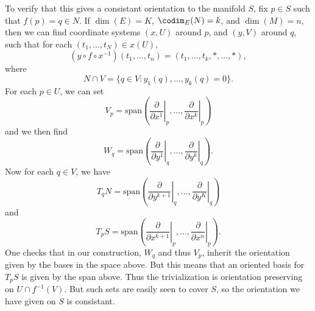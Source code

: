 To verify that this gives a consistant orientation to the manifold $S$, fix $p \in S$ such that $f(p) = q \in N$. If $\dim(E) = K$, $\codim_E(N) = k$, and $\dim(M) = n$, then we can find coordinate systems $(x,U)$ around $p$, and $(y,V)$ around $q$, such that for each $(t_1, \dots, t_N) \in x(U)$,
%
\[ (y \circ f \circ x^{-1})(t_1, \dots, t_n) = (t_1, \dots, t_k, *, \dots, *), \]
%
where
%
\[ N \cap V = \{ q \in V : y_1(q), \dots, y_k(q) = 0 \}. \]
%
For each $p \in U$, we can set
%
\[ V_p = \text{span} \left( \left. \frac{\partial}{\partial x^1} \right|_p, \dots, \left. \frac{\partial}{\partial x^k} \right|_p \right) \]
%
and we then find
%
\[ W_q = \text{span} \left( \left. \frac{\partial}{\partial y^1} \right|_q, \dots, \left. \frac{\partial}{\partial y^k} \right|_q \right). \]
%
Now for each $q \in V$, we have
%
\[ T_q N = \text{span} \left( \left. \frac{\partial}{\partial y^{k+1}} \right|_q, \dots, \left. \frac{\partial}{\partial y^K} \right|_q \right) \]
%
and
%
\[ T_p S = \text{span} \left( \left. \frac{\partial}{\partial x^{k+1}} \right|_p, \dots, \left. \frac{\partial}{\partial x^n} \right|_p \right). \]
%
One checks that in our construction, $W_q$ and thus $V_p$, inherit the orientation given by the bases in the space above. But this means that an oriented basis for $T_p S$ is given by the span above. Thus the trivialization is orientation preserving on $U \cap f^{-1}(V)$. But such sets are easily seen to cover $S$, so the orientation we have given on $S$ is consistant.

